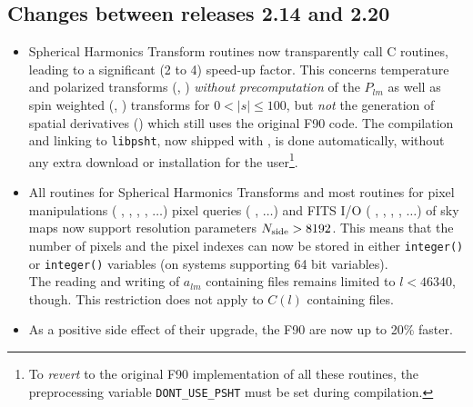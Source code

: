 \documentclass[12pt,twoside]{article}
\newcommand{\nside}{{N_{\rm side}}}
\begin{document}
{\subsection[Changes between releases 2.14 and 2.20]{Changes between releases 2.14 and
2.20}
\label{sub:new2p20}
\begin{itemize}
\item Spherical Harmonics Transform routines now transparently call  C routines, leading to a significant (2 to 4) speed-up factor. This
concerns temperature and polarized transforms (, 
) {\em without precomputation} of the $P_{lm}$ as
well as spin 
weighted (, 
) transforms for $0 < |s| \le 100$,
but {\em not} the generation of spatial derivatives
() which still uses the original F90 code.
The compilation and linking to {\tt libpsht}, now shipped with \healpix, is done
automatically, without any extra download or installation for the user\footnote{
To {\em revert} to the original F90 implementation of all these routines, the preprocessing
variable {\tt DONT\_USE\_PSHT} must be set during compilation.}.

\item All routines for Spherical Harmonics Transforms and most routines for
pixel manipulations (
,
, 
, 
,  
$\ldots$)
pixel queries (
,  $\ldots$) 
and FITS I/O (%
, 
, 
, 
,
$\ldots$)
of sky maps
now support resolution parameters $\nside > 8192$. 
This means that the number of
pixels and the pixel indexes can now be stored in either
{\tt integer()} or
{\tt integer()} variables (on systems
supporting 64 bit variables).\\
The reading and writing of
$a_{lm}$ containing files remains limited to $l < 46340 $, though. This
restriction does not apply to $C(l)$ containing files.

\item As a positive side effect of their upgrade, the F90
 are now up to 20\% faster.


\end{itemize}}
\end{document}
